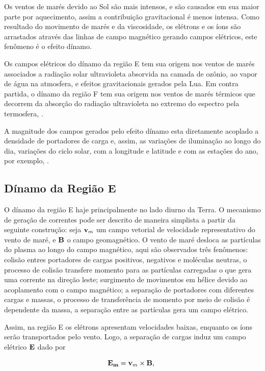 Os ventos de marés devido ao Sol são mais intensos, e são causados em sua maior parte por aquecimento, assim a contribuição gravitacional é menos intensa. Como resultado do movimento de marés e da viscosidade, os elétrons e os íons são arrastados através das linhas de campo magnético gerando campos elétricos, este fenômeno é o efeito dínamo.

Os campos elétricos do dínamo da região E tem sua origem nos ventos de marés associados a radiação solar ultravioleta absorvida na camada de ozônio, ao vapor de água na atmosfera, e efeitos gravitacionais gerados pela Lua. Em contra partida, o dínamo da região F tem sua origem nos ventos de marés térmicos que decorrem da absorção do radiação ultravioleta no extremo do espectro pela termosfera, \cite{ABDU:2005}.

A magnitude dos campos gerados pelo efeito dínamo esta diretamente acoplado a densidade de portadores de carga e, assim, as variações de iluminação ao longo do dia, variações do ciclo solar, com a longitude e latitude e com as estações do ano, por exemplo, \cite{FEJER:1999}.

\subsection{Dínamo da Região E} 

O dínamo da região E haje principalmente no lado diurno da Terra. O mecanismo de geração de correntes pode ser descrito de maneira simplista a partir da seguinte construção: seja ${\bf v}_m$ um campo vetorial de velocidade representativo do vento de maré, e ${\bf B}$ o campo geomagnético. O vento de maré desloca as partículas do plasma ao longo do campo magnético, aqui são observados três fenômenos: colisão entres portadores de cargas positivos, negativos e moléculas neutras, o processo de colisão transfere momento para as partículas carregadas o que gera uma corrente na direção leste; surgimento de movimentos em hélice devido ao acoplamento com o campo magnético; a separação de portadores com diferentes cargas e massas, o processo de transferência de momento por meio de colisão é dependente da massa, a separação entre as partículas gera um campo elétrico.

Assim, na região E os elétrons apresentam velocidades baixas, enquanto os íons serão transportados pelo vento. Logo, a separação de cargas induz um campo elétrico ${\bf E}$ dado por 

\begin{equation}
{\bf E_m} = {\bf v}_m\times{\bf B}\mbox{,}~
\end{equation}

